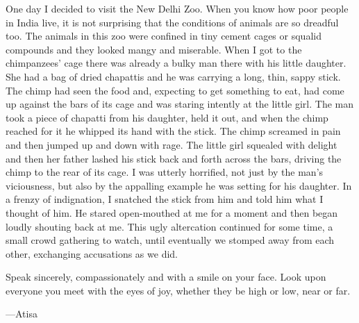 \documentclass[10pt, openright]{book}
\newenvironment{epigram-2}%
{%
\setstretch{1.4}
\vspace{1em}
\noindent
\quoting[leftmargin=2cm,rightmargin=2cm]%
\begin{itshape}
\large
}%
{\end{itshape}\endquoting
}%
\newenvironment{epigram-2-cite}%
{%
\quoting[leftmargin=2cm,rightmargin=2cm]%
\noindent\normal\hspace*{\fill} 
}%
{\endquoting
}%
\begin{document}
One day I decided to visit the New Delhi Zoo. When you know how poor people in India live, it is not surprising that the conditions of animals are so dreadful too. The animals in this zoo were confined in tiny cement cages or squalid compounds and they looked mangy and miserable. When I got to the chimpanzees’ cage there was already a bulky man there with his little daughter. She had a bag of dried chapattis and he was carrying a long, thin, sappy stick. The chimp had seen the food and, expecting to get something to eat, had come up against the bars of its cage and was staring intently at the little girl. The man took a piece of chapatti from his daughter, held it out, and when the chimp reached for it he whipped its hand with the stick. The chimp screamed in pain and then jumped up and down with rage. The little girl squealed with delight and then her father lashed his stick back and forth across the bars, driving the chimp to the rear of its cage. I was utterly horrified, not just by the man’s viciousness, but also by the appalling example he was setting for his daughter. In a frenzy of indignation, I snatched the stick from him and told him what I thought of him. He stared open-mouthed at me for a moment and then began loudly shouting back at me. This ugly altercation continued for some time, a small crowd gathering to watch, until eventually we stomped away from each other, exchanging accusations as we did.


\begin{epigram-2}
Speak sincerely, compassionately and with a smile on your face. Look upon everyone you meet with the eyes of joy, whether they be high or low, near or far.
\end{epigram-2}
\begin{epigram-2-cite}
—Atisa
\end{epigram-2-cite}
\end{document}
